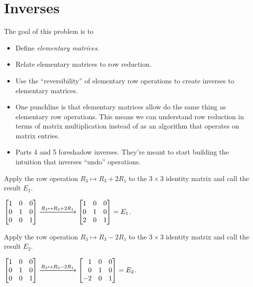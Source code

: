 	\bookonlynewpage
\section*{Inverses}

	\question
	\begin{annotation}
		\begin{goals}

			The goal of this problem is to
			\begin{itemize}
				\item Define \emph{elementary matrices}.
				\item Relate elementary matrices to row reduction.
				\item Use the ``reversibility'' of elementary row
					operations to create inverses to elementary matrices.
			\end{itemize}
		\end{goals}

		\begin{notes}
			\begin{itemize}
				\item One punchline is that elementary matrices
					allow do the same thing as elementary row
					operations. This means we can understand row
					reduction in terms of matrix multiplication instead
					of as an algorithm that operates on matrix entries.
				\item Parts 4 and 5 foreshadow inverses. They're meant to start
					building the intuition that inverses ``undo'' operations.
			\end{itemize}
		\end{notes}
	\end{annotation}
	\begin{parts}
		\item Apply the row operation $R_3\mapsto R_3+2R_1$ to the $3\times 3$ identity
		matrix and call the result $E_1$.
			\begin{solution}
				$\mat{1&0&0\\0&1&0\\0&0&1} \xrightarrow{R_3\mapsto R_3+2R_1} \mat{1&0&0\\0&1&0\\2&0&1}=E_1$.
			\end{solution}
		\item Apply the row operation $R_3\mapsto R_3-2R_1$ to the $3\times 3$ identity
		matrix and call the result $E_2$.
			\begin{solution}
				$\mat{1&0&0\\0&1&0\\0&0&1} \xrightarrow{R_3\mapsto R_3-2R_1} \mat{1&0&0\\0&1&0\\-2&0&1}=E_2$.
			\end{solution}
	\end{parts}

